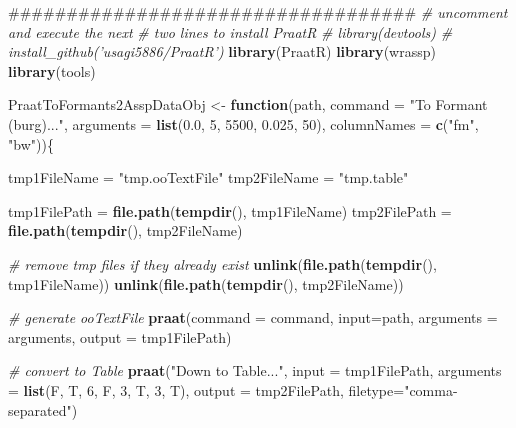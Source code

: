 \documentclass[]{book}
\newenvironment{Shaded}{\begin{snugshade}}{\end{snugshade}}
\newcommand{\CommentTok}[1]{\textcolor[rgb]{0.56,0.35,0.01}{\textit{#1}}}
\newcommand{\ControlFlowTok}[1]{\textcolor[rgb]{0.13,0.29,0.53}{\textbf{#1}}}
\newcommand{\DataTypeTok}[1]{\textcolor[rgb]{0.13,0.29,0.53}{#1}}
\newcommand{\DecValTok}[1]{\textcolor[rgb]{0.00,0.00,0.81}{#1}}
\newcommand{\FloatTok}[1]{\textcolor[rgb]{0.00,0.00,0.81}{#1}}
\newcommand{\KeywordTok}[1]{\textcolor[rgb]{0.13,0.29,0.53}{\textbf{#1}}}
\newcommand{\NormalTok}[1]{#1}
\newcommand{\StringTok}[1]{\textcolor[rgb]{0.31,0.60,0.02}{#1}}
\theoremstyle{definition}
\theoremstyle{definition}
\theoremstyle{definition}
\theoremstyle{remark}
\begin{document}
\begin{Shaded}
\begin{Highlighting}[]
\NormalTok{###################################}
\CommentTok{# uncomment and execute the next }
\CommentTok{# two lines to install PraatR}
\CommentTok{# library(devtools)}
\CommentTok{# install_github('usagi5886/PraatR')}
\KeywordTok{library}\NormalTok{(PraatR)}
\KeywordTok{library}\NormalTok{(wrassp)}
\KeywordTok{library}\NormalTok{(tools)}

\NormalTok{PraatToFormants2AsspDataObj <-}\StringTok{ }\ControlFlowTok{function}\NormalTok{(path,}
                                        \DataTypeTok{command =} 
                                          \StringTok{"To Formant (burg)..."}\NormalTok{,}
                                        \DataTypeTok{arguments =} \KeywordTok{list}\NormalTok{(}\FloatTok{0.0}\NormalTok{, }
                                                         \DecValTok{5}\NormalTok{, }\DecValTok{5500}\NormalTok{, }
                                                         \FloatTok{0.025}\NormalTok{, }\DecValTok{50}\NormalTok{), }
                                        \DataTypeTok{columnNames =} \KeywordTok{c}\NormalTok{(}\StringTok{"fm"}\NormalTok{, }\StringTok{"bw"}\NormalTok{))\{}
  
\NormalTok{  tmp1FileName =}\StringTok{ "tmp.ooTextFile"}
\NormalTok{  tmp2FileName =}\StringTok{ "tmp.table"}
  
\NormalTok{  tmp1FilePath =}\StringTok{ }\KeywordTok{file.path}\NormalTok{(}\KeywordTok{tempdir}\NormalTok{(), tmp1FileName)}
\NormalTok{  tmp2FilePath =}\StringTok{ }\KeywordTok{file.path}\NormalTok{(}\KeywordTok{tempdir}\NormalTok{(), tmp2FileName)}
  
  \CommentTok{# remove tmp files if they already exist}
  \KeywordTok{unlink}\NormalTok{(}\KeywordTok{file.path}\NormalTok{(}\KeywordTok{tempdir}\NormalTok{(), tmp1FileName))}
  \KeywordTok{unlink}\NormalTok{(}\KeywordTok{file.path}\NormalTok{(}\KeywordTok{tempdir}\NormalTok{(), tmp2FileName))}
  
  \CommentTok{# generate ooTextFile}
  \KeywordTok{praat}\NormalTok{(}\DataTypeTok{command =}\NormalTok{ command, }
        \DataTypeTok{input=}\NormalTok{path, }
        \DataTypeTok{arguments =}\NormalTok{ arguments, }
        \DataTypeTok{output =}\NormalTok{ tmp1FilePath)}
  
  \CommentTok{# convert to Table}
  \KeywordTok{praat}\NormalTok{(}\StringTok{"Down to Table..."}\NormalTok{,}
        \DataTypeTok{input =}\NormalTok{ tmp1FilePath,}
        \DataTypeTok{arguments =} \KeywordTok{list}\NormalTok{(F, T, }\DecValTok{6}\NormalTok{, F, }\DecValTok{3}\NormalTok{, T, }\DecValTok{3}\NormalTok{, T), }
        \DataTypeTok{output =}\NormalTok{ tmp2FilePath,}
        \DataTypeTok{filetype=}\StringTok{"comma-separated"}\NormalTok{)}
  

\end{Highlighting}
\end{Shaded}
\end{document}
